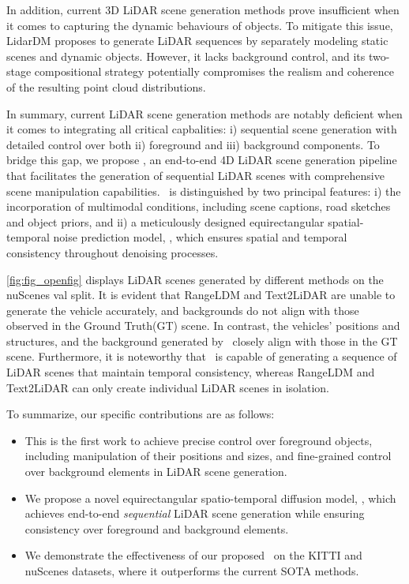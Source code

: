 In addition, current 3D LiDAR scene generation methods prove insufficient when it comes to capturing the dynamic behaviours of objects. To mitigate this issue, LidarDM \cite{zyrianov2024lidardm} proposes to generate LiDAR sequences by separately modeling static scenes and dynamic objects. However, it lacks background control, and its two-stage compositional strategy potentially compromises the realism and coherence of the resulting point cloud distributions.


In summary, current LiDAR scene generation methods are notably deficient when it comes to integrating all critical capbalities: i) sequential scene generation with detailed control over both ii) foreground and iii) background components.  
To bridge this gap, we propose \sysname, an end-to-end 4D LiDAR scene generation pipeline that facilitates the generation of sequential LiDAR scenes with comprehensive scene manipulation capabilities. 
\sysname\ is distinguished by two principal features: i) the incorporation of multimodal conditions, including scene captions, road sketches and object priors, and ii) a meticulously designed equirectangular spatial-temporal noise prediction model, \modelname, which ensures spatial and temporal consistency throughout denoising processes. 

\cref{fig:fig_openfig} displays LiDAR scenes generated by different methods on the nuScenes val split. It is evident that RangeLDM \cite{hu2025rangeldm} and Text2LiDAR \cite{wu2024text2lidar} are unable to generate the vehicle accurately, and backgrounds do not align with those observed in the Ground Truth(GT) scene. In contrast, the vehicles' positions and structures, and the background generated by \sysname\ closely align with those in the GT scene. Furthermore, it is noteworthy that \sysname\ is capable of generating a sequence of LiDAR scenes that maintain temporal consistency, whereas RangeLDM \cite{hu2025rangeldm} and Text2LiDAR \cite{wu2024text2lidar} can only create individual LiDAR scenes in isolation.

To summarize, our specific contributions are as follows:
\begin{itemize}
    \item This is the first work to achieve precise control over foreground objects, including manipulation of their positions and sizes, and fine-grained control over background elements in LiDAR scene generation.  
    \item We propose a novel equirectangular spatio-temporal diffusion model, \modelname,  which achieves end-to-end \textit{sequential} LiDAR scene generation while ensuring consistency over foreground and background elements.
    \item We demonstrate the effectiveness of our proposed \sysname\ on the KITTI and nuScenes datasets, where it outperforms the current SOTA methods.
\end{itemize}

